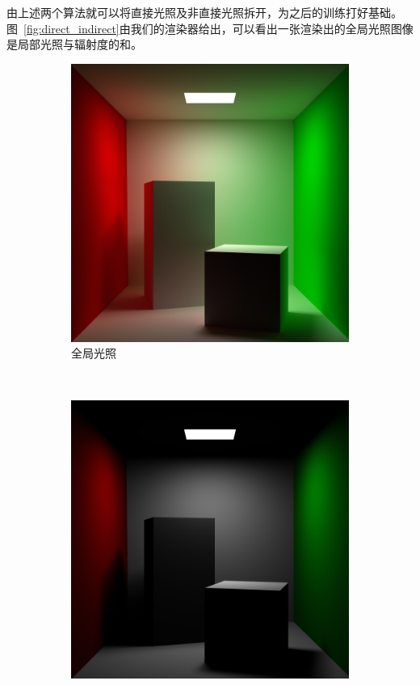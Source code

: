 由上述两个算法就可以将直接光照及非直接光照拆开，为之后的训练打好基础。图~\ref{fig:direct_indirect}由我们的渲染器给出，可以看出一张渲染出的全局光照图像是局部光照与辐射度的和。
\begin{figure}[h]
    \centering
    \begin{subfigure}{0.3\textwidth}
        \includegraphics[width=\textwidth]{img/all.png}
        \caption{全局光照}
    \end{subfigure}
    ~
    \begin{subfigure}{0.3\textwidth}
        \includegraphics[width=\textwidth]{img/direct.png}

\end{subfigure}
\end{figure}
